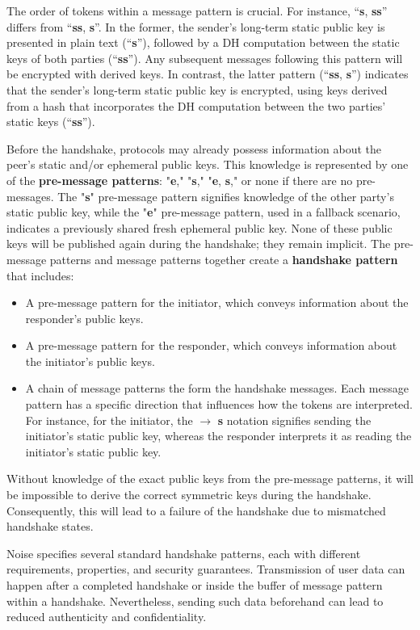 The order of tokens within a message pattern is crucial. For instance, ``\textbf{s}, \textbf{ss}''
differs from ``\textbf{ss}, \textbf{s}''. In the former, the sender’s long-term static public key is presented 
in plain text (``\textbf{s}''), followed by a DH computation between the static keys of both parties (``\textbf{ss}''). 
Any subsequent messages following this pattern will be encrypted with derived keys. In contrast, 
the latter pattern (``\textbf{ss}, \textbf{s}'') indicates that the sender’s long-term static public key is encrypted, 
using keys derived from a hash that incorporates the DH computation between the two parties' static 
keys (``\textbf{ss}'').

Before the handshake, protocols may already possess information about the peer's static and/or 
ephemeral public keys. This knowledge is represented by one of the \textbf{pre-message patterns}: "\textbf{e}," "\textbf{s}," 
"\textbf{e}, \textbf{s}," or none if there are no pre-messages. The "\textbf{s}" pre-message 
pattern signifies knowledge of the other party's static public key, while the "\textbf{e}" pre-message pattern, 
used in a fallback scenario, indicates a previously shared fresh ephemeral public key. None of 
these public keys will be published again during the handshake; they remain implicit. 
The pre-message patterns and message patterns together create a \textbf{handshake pattern} that includes: 
\begin{itemize}
  \item A pre-message pattern for the initiator, which conveys information about the responder’s public keys.
  \item A pre-message pattern for the responder, which conveys information about the initiator’s public keys.
  \item A chain of message patterns the form the handshake messages. Each message pattern has a specific direction that influences how the tokens are interpreted. 
  For instance, for the initiator, the $\rightarrow$ \textbf{s} notation signifies sending the 
  initiator’s static public key, whereas the responder interprets it as reading the initiator’s 
  static public key.
\end{itemize}

Without knowledge of the exact public keys from the pre-message patterns, it will be 
impossible to derive the correct symmetric keys during the handshake. Consequently, 
this will lead to a failure of the handshake due to mismatched handshake states.


Noise specifies several standard handshake patterns, each with different requirements, 
properties, and security guarantees. Transmission of user data can happen after a completed
handshake or inside the buffer of message pattern within a handshake. Nevertheless, sending such
data beforehand can lead to reduced authenticity and confidentiality.

